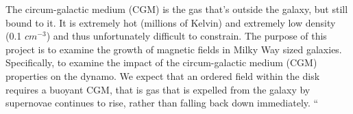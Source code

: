The circum-galactic medium (CGM) is the gas that's outside the galaxy, but still
bound to it.  It is extremely hot (millions of Kelvin) and extremely low density
(0.1 $cm^{-3}$) and thus unfortunately difficult to constrain.
The purpose of this project is to examine the growth of magnetic fields in Milky
Way sized galaxies.  
Specifically, to examine the impact of the circum-galactic
medium (CGM) properties on the dynamo. We expect that an ordered field within
the disk requires a buoyant CGM, that is gas that is expelled from the galaxy by
supernovae continues to rise, rather than falling back down immediately.  ``
